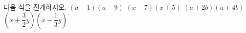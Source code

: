 다음 식을 전개하시오.
 $(a-1)(a-9)$
 $(x-7)(x+5)$
 $(a+2b)(a+4b)$
 $\left(x+\dfrac{3}{2}y\right)\left(x-\dfrac{1}{3}y\right)$
